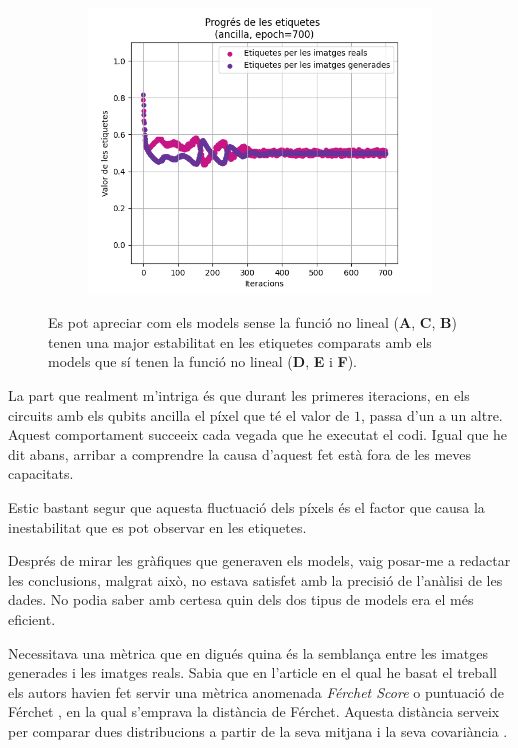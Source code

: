 \begin{figure}[H]
\begin{subfigure}[b]{.32\linewidth}
		\includegraphics[width=\linewidth]{figures/data/L_A6.png}
		\caption{}
	\end{subfigure}
	\caption{Es pot apreciar com els models sense la funció no lineal (\textbf{A}, \textbf{C}, \textbf{B}) tenen una major estabilitat en les etiquetes comparats amb els models que sí tenen la funció no lineal (\textbf{D}, \textbf{E} i \textbf{F}).}
	\label{fig:700_labels}
\end{figure}

La part que realment m'intriga és que durant les primeres iteracions, en els circuits amb els qubits ancilla el píxel que té el valor de $1$, passa d'un a un altre. Aquest comportament succeeix  cada vegada que he executat el codi. Igual que he dit abans, arribar a comprendre la causa d'aquest fet està fora de les meves capacitats.

Estic bastant segur que aquesta fluctuació dels píxels és el factor que causa la inestabilitat que es pot observar en les etiquetes.

Després de mirar les gràfiques que generaven els models, vaig posar-me a redactar les conclusions, malgrat això, no estava satisfet amb la precisió de l'anàlisi de les dades. No podia saber amb certesa quin dels dos tipus de models era el més eficient. 

Necessitava una mètrica que en digués quina és la semblança entre les imatges generades i les imatges reals. Sabia que en l'article en el qual he basat el treball els autors havien fet servir una mètrica anomenada \textit{Férchet Score} o puntuació de Férchet \cite{QGAN_exp}, en la qual s'emprava la distància de Férchet. Aquesta distància serveix per comparar dues distribucions a partir de la seva mitjana i la seva covariància \cite{sd_score}.

